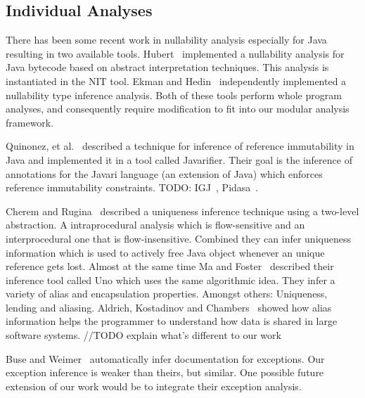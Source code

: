 \subsection{Individual Analyses}

There has been some recent work in nullability analysis especially for Java
resulting in two available tools.  Hubert~\cite{NIT} implemented a nullability
analysis for Java bytecode based on abstract interpretation techniques.  This
analysis is instantiated in the {\sc NIT} tool.  Ekman and
Hedin~\cite{NonNullTypeInference} independently implemented a nullability type
inference analysis.  Both of these tools perform whole program analyses, and
consequently require modification to fit into our modular analysis framework.

Quinonez, et al.~\cite{Javarifier} described a technique for inference of
reference immutability in Java and implemented it in a tool called {\sc
  Javarifier}. Their goal is the inference of annotations for the {\sc Javari}
language (an extension of Java) which enforces reference immutability
constraints. TODO: IGJ~\cite{IGJ}, Pidasa~\cite{Pidasa}.

Cherem and Rugina~\cite{UniquenessInference} described a uniqueness inference
technique using a two-level abstraction. A intraprocedural analysis which is
flow-sensitive and an interprocedural one that is flow-insensitive. Combined
they can infer uniqueness information which is used to actively free Java
object whenever an unique reference gets lost.  Almost at the same time Ma and
Foster~\cite{Uno} described their inference tool called Uno which uses the same
algorithmic idea. They infer a variety of alias and encapsulation
properties. Amongst others: Uniqueness, lending and aliasing.  Aldrich,
Kostadinov and Chambers~\cite{AliasJava} showed how alias information helps the
programmer to understand how data is shared in large software systems.
//TODO explain what's different to our work

Buse and Weimer~\cite{autodoc} automatically infer documentation for
exceptions.  Our exception inference is weaker than theirs, but similar.  One
possible future extension of our work would be to integrate their exception
analysis.
